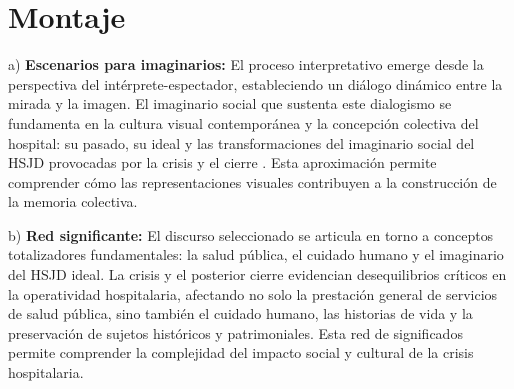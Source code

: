 \section{Montaje}

a) \textbf{Escenarios para imaginarios:} El proceso interpretativo emerge desde la perspectiva del intérprete-espectador, estableciendo un diálogo dinámico entre la mirada y la imagen. El imaginario social que sustenta este dialogismo se fundamenta en la cultura visual contemporánea y la concepción colectiva del hospital: su pasado, su ideal y las transformaciones del imaginario social del HSJD provocadas por la crisis y el cierre \parencite{Gongora2013}. Esta aproximación permite comprender cómo las representaciones visuales contribuyen a la construcción de la memoria colectiva.

b) \textbf{Red significante:} El discurso seleccionado se articula en torno a conceptos totalizadores fundamentales: la salud pública, el cuidado humano y el imaginario del HSJD ideal. La crisis y el posterior cierre evidencian desequilibrios críticos en la operatividad hospitalaria, afectando no solo la prestación general de servicios de salud pública, sino también el cuidado humano, las historias de vida y la preservación de sujetos históricos y patrimoniales. Esta red de significados permite comprender la complejidad del impacto social y cultural de la crisis hospitalaria.

